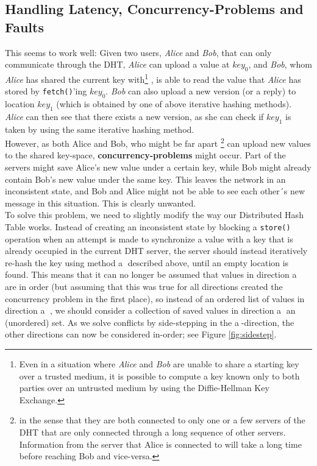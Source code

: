 \documentclass[a4paper]{article}
\begin{document}
\subsection{Handling Latency, Concurrency-Problems and Faults}

This seems to work well: Given two users, \textit{Alice} and \textit{Bob}, that can only communicate through the DHT, \textit{Alice} can upload a value at $key_0$, and \textit{Bob}, whom \textit{Alice} has shared the current key with\footnote{Even in a situation where \textit{Alice} and \textit{Bob} are unable to share a starting key over a trusted medium, it is possible to compute a key known only to both parties over an untrusted medium by using the Diffie-Hellman Key Exchange. } , is able to read the value that \textit{Alice} has stored by \texttt{fetch()}'ing $key_0$. \textit{Bob} can also upload a new version (or a reply) to location $key_1$ (which is obtained by one of above iterative hashing methods). \textit{Alice} can then see that there exists a new version, as she can check if $key_1$ is taken by using the same iterative hashing method. \\

However, as both Alice and Bob, who might be far apart \footnote{in the sense that they are both connected to only one or a few servers of the DHT that are only connected through a long sequence of other servers. Information from the server that Alice is connected to will take a long time before reaching Bob and vice-versa.} can upload new values to the shared key-space, \textbf{concurrency-problems} might occur. Part of the servers might save Alice's new value under a certain key, while Bob might already contain Bob's new value under the same key. This leaves the network in an inconsistent state, and Bob and Alice might not be able to see each other´s new message in this situation. This is clearly unwanted.\\

To solve this problem, we need to slightly modify the way our Distributed Hash Table works. Instead of creating an inconsistent state by blocking a \texttt{store()} operation when an attempt is made to synchronize a value with a key that is already occupied in the current DHT server, the server should instead iteratively re-hash the key using method \textcircled{a} described above, until an empty location is found. This means that it can no longer be assumed that values in direction \textcircled{a} are in order (but assuming that this was true for all directions created the concurrency problem in the first place), so instead of an ordered list of values in direction \textcircled{a} , we should consider a collection of saved values in direction \textcircled{a} an (unordered) set. As we solve conflicts by side-stepping in the \textcircled{a}-direction, the other directions can now be considered in-order; see Figure \ref{fig:sidestep}. \\
\end{document}
